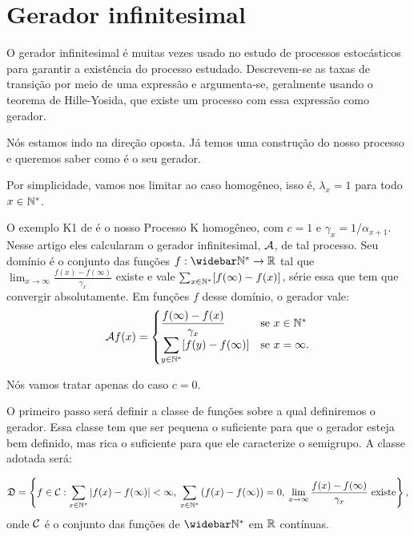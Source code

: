 \section{Gerador infinitesimal}
\label{sec:gerador}


O gerador infinitesimal é muitas vezes usado no estudo de processos
estocásticos para garantir a existência do processo
estudado. Descrevem-se as taxas de transição por meio de uma expressão
e argumenta-se, geralmente usando o teorema de Hille-Yosida, que
existe um processo com essa expressão como gerador.

Nós estamos indo na direção oposta. Já temos uma construção do nosso
processo e queremos saber como é o seu gerador.

Por simplicidade, vamos nos limitar ao caso homogêneo, isso é,
$\lambda_x = 1$ para todo $x \in {\mathbb{N^*}}$.

O exemplo K1 de \cite{kendall:56} é o nosso Processo K homogêneo, com
$c = 1$ e $\gamma_x = 1/\alpha_{x+1}$. Nesse artigo eles calcularam o
gerador infinitesimal, ${\mathcal{A}}$, de tal processo. Seu domínio é o
conjunto das funções $f: \Nzb \to \R$ tal que $\lim_{x \to \infty}
\frac{f(x) - f(\infty)}{\gamma_x}$ existe e vale $\sum_{x \in {\mathbb{N^*}}}
[f(\infty) - f(x)]$, série essa que tem que convergir
absolutamente. Em funções $f$ desse domínio, o gerador vale:
\begin{align*}
  {\mathcal{A}} f (x) = \begin{cases}
    \displaystyle
    \frac{f(\infty) - f(x)}{\gamma_x} & \text{se } x \in {\mathbb{N^*}}\\
    \displaystyle
    \sum_{y\in {\mathbb{N^*}}} [f(y) - f(\infty)] & \text{se } x = \infty.
  \end{cases}
\end{align*}

Nós vamos tratar apenas do caso $c = 0$.

O primeiro passo será definir a classe de funções sobre a qual
definiremos o gerador. Essa classe tem que ser pequena o suficiente
para que o gerador esteja bem definido, mas rica o suficiente para que
ele caracterize o semigrupo. A classe adotada será:

\begin{equation}
  \label{eq:classe-gerador}
  {\mathfrak{D}} = \left\{ f \in {\mathcal{C}}: \sum_{x\in {\mathbb{N^*}}} |f(x)-f(\infty)| < \infty,
    \:
    \sum_{x\in {\mathbb{N^*}}} \left( f(x)-f(\infty)\right) = 0, \:
    \lim_{x \to \infty} \frac{f(x) - f(\infty)}{\gamma_x} \textrm{ existe}
  \right\},
\end{equation}
onde ${\mathcal{C}}$ é o conjunto das funções de $\Nzb$ em ${\mathbb{R}}$ contínuas.


